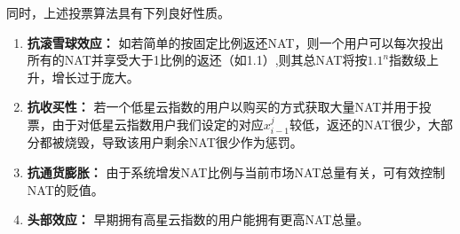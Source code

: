 同时，上述投票算法具有下列良好性质。
\begin{enumerate}
	\item \textbf{抗滚雪球效应：} 如若简单的按固定比例返还NAT，则一个用户可以每次投出所有的NAT并享受大于1比例的返还（如1.1）,则其总NAT将按$1.1^n$指数级上升，增长过于庞大。
	\item \textbf{抗收买性：} 若一个低星云指数的用户以购买的方式获取大量NAT并用于投票，由于对低星云指数用户我们设定的对应$x_{i-1}^j$较低，返还的NAT很少，大部分都被烧毁，导致该用户剩余NAT很少作为惩罚。
	\item \textbf{抗通货膨胀：} 由于系统增发NAT比例与当前市场NAT总量有关，可有效控制NAT的贬值。
	\item \textbf{头部效应：} 早期拥有高星云指数的用户能拥有更高NAT总量。
\end{enumerate}
